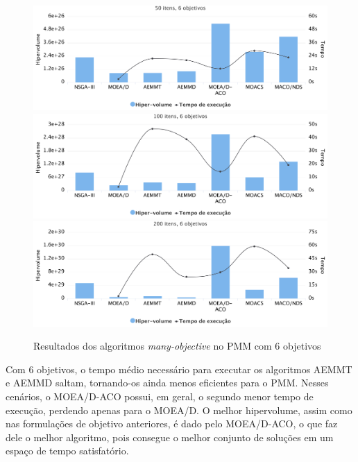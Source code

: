 \begin{figure}[!htbp]
	\includegraphics[width=1\textwidth]{cap_experimentos/figs/etapa4/i50o6}
	\includegraphics[width=1\textwidth]{cap_experimentos/figs/etapa4/i100o6}
	\includegraphics[width=1\textwidth]{cap_experimentos/figs/etapa4/i200o6}
	\caption{\label{fig_exp4_mkp_o6}Resultados dos algoritmos \textit{many-objective} no PMM com 6 objetivos}
\end{figure}

Com 6 objetivos, o tempo médio necessário para executar os algoritmos AEMMT e AEMMD saltam, tornando-os ainda menos eficientes para o PMM. Nesses cenários, o MOEA/D-ACO possui, em geral, o segundo menor tempo de execução, perdendo apenas para o MOEA/D. O melhor hipervolume, assim como nas formulações de objetivo anteriores, é dado pelo MOEA/D-ACO, o que faz dele o melhor algoritmo, pois consegue o melhor conjunto de soluções em um espaço de tempo satisfatório.

